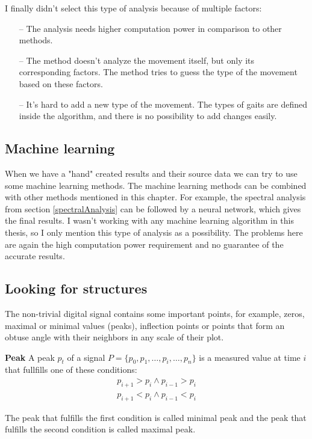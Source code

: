 I finally didn't select this type of analysis because of multiple factors:
\begin{itemize}
    \item[--] The analysis needs higher computation power in comparison to other methods.
    \item[--] The method doesn't analyze the movement itself, but only its corresponding factors. The method tries to guess the type of the movement based on these factors.
    \item[--] It's hard to add a new type of the movement. The types of gaits are defined inside the algorithm, and there is no possibility to add changes easily.
\end{itemize}

\subsection{Machine learning}
When we have a "hand" created results and their source data we can try to use some machine learning methods. The machine learning methods can be combined with other methods mentioned in this chapter. For example, the spectral analysis from section \ref{spectralAnalysis} can be followed by a neural network, which gives the final results. I wasn't working with any machine learning algorithm in this thesis, so I only mention this type of analysis as a possibility. The problems here are again the high computation power requirement and no guarantee of the accurate results.

\subsection{Looking for structures}
\label{signalLabelling}
The non-trivial digital signal contains some important points, for example, zeros, maximal or minimal values (peaks), inflection points or points that form an obtuse angle with their neighbors in any scale of their plot.

\begin{definition}{\textbf{Peak}}
    A peak $p_t$ of a signal $P = \{p_0, p_1, \dots, p_i, \dots, p_n\}$ is a measured value at time $i$ that fullfills one of these conditions:
    \begin{eqnarray}
    p_{i+1} > p_i \land p_{i-1} > p_i \\
    p_{i+1} < p_i \land p_{i-1} < p_i
    \end{eqnarray}
    
    The peak that fulfills the first condition is called minimal peak and the peak that fulfills the second condition is called maximal peak.
\end{definition}

